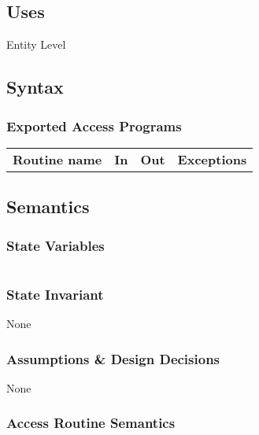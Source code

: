\documentclass[12pt]{article}
\begin{document}
\subsection* {Uses}
Entity
Level
\subsection* {Syntax}

\subsubsection* {Exported Access Programs}

\begin{tabular}{| l | l | l | l |}
\hline
\textbf{Routine name} & \textbf{In} & \textbf{Out} & \textbf{Exceptions}\\

\end{tabular}

\subsection* {Semantics}

\subsubsection* {State Variables}

\begin{tabular}{lll}
\end{tabular}

\subsubsection* {State Invariant}

None

\subsubsection* {Assumptions \& Design Decisions}

None

\subsubsection* {Access Routine Semantics}



\newpage
\end{document}
